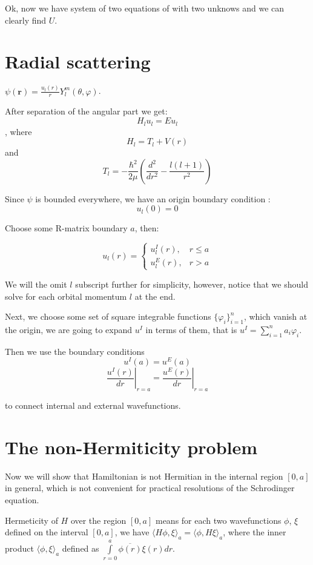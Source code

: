 \documentclass[12pt, a4paper]{article}
\let\conj\overline
\begin{document}
Ok, now we have system of two equations of with two unknows and we can clearly find $U$.

\section{Radial scattering}

$\psi(\mathbf{r}) = \frac{u_l(r)}{r} Y_l^m(\theta, \varphi)$.

After separation of the angular part we get:
$$H_l u_l = E u_l$$
, where
$$H_l = T_l + V(r)$$
and
$$T_l = - \frac{\hbar^2}{2 \mu} \left( \frac{d^2}{dr^2} - \frac{l (l + 1)}{r^2} \right)$$

Since $\psi$ is bounded everywhere, we have an origin boundary condition :
$$u_l(0) = 0$$


Choose some R-matrix boundary $a$, then:

$$u_l(r) = \begin{cases} u_l^I(r), & r \le a \\ u_l^E(r), & r > a \end{cases}$$

We will the omit $l$ subscript further for simplicity, however, notice that we should solve for each orbital momentum $l$ at the end. 

Next, we choose some  set of square integrable functions $\{\varphi_i\}_{i=1}^n$, which vanish at the origin, we are going to expand $u^I$ in terms of them, that is $u^I = \sum\limits_{i = 1}^n a_i \varphi_i$.

Then we use the boundary conditions
$$u^I(a) = u^E(a)$$
$$\left.\frac{u^I(r)}{dr}\right|_{r = a} = \left.\frac{u^E(r)}{dr}\right|_{r = a}$$

to connect internal and external wavefunctions.

\section{The non-Hermiticity problem}
Now we will show that Hamiltonian is not Hermitian in the internal region $[0, a]$ in general, which is not convenient for practical resolutions of the Schrodinger equation. 

Hermeticity of $H$ over the region $[0, a]$ means for each two wavefunctions $\phi$, $\xi$ defined on the interval $[0, a]$, we have $\langle H \phi, \xi \rangle_a = \langle \phi, H \xi \rangle_a$, where the inner product $\langle \phi, \xi \rangle_a$ defined as $\int\limits_{r = 0}^a \conj{\phi(r)} \xi(r) dr$.
\end{document}
